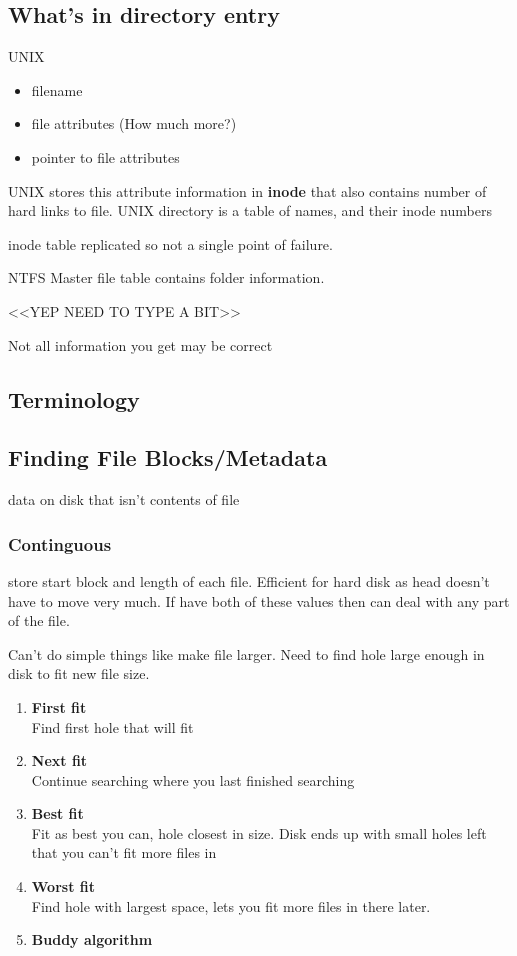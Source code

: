 \documentclass{article}
\begin{document}
	\subsection{What's in directory entry}
		UNIX
			\begin{itemize}
				\item filename
				\item file attributes (How much more?)
				\item pointer to file attributes
			\end{itemize}

			UNIX stores this attribute information in \textbf{inode} that also contains number of hard links to file.
			UNIX directory is a table of names, and their inode numbers

			inode table replicated so not a single point of failure.

		NTFS
			Master file table contains folder information.

			<<YEP NEED TO TYPE A BIT>>

			Not all information you get may be correct

	\subsection{Terminology}

	\subsection{Finding File Blocks/Metadata}
		data on disk that isn't contents of file
		\subsubsection{Continguous }
			store start block and length of each file.
			Efficient for hard disk as head doesn't have to move very much.
			If have both of these values then can deal with any part of the file.

			Can't do simple things like make file larger. Need to find hole large enough in disk to fit new file size.

			\begin{enumerate}
				\item \textbf{First fit}\\
					Find first hole that will fit
				\item \textbf{Next fit}\\
					Continue searching where you last finished searching
				\item \textbf{Best fit}\\
					Fit as best you can, hole closest in size. Disk ends up with small holes left that you can't fit more files in
				\item \textbf{Worst fit}\\
					Find hole with largest space, lets you fit more files in there later.
				\item \textbf{Buddy algorithm}\\

			\end{enumerate}
\end{document}
